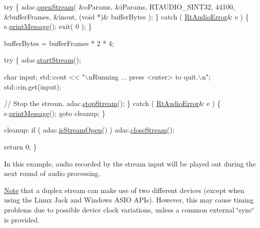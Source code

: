 \begin{DoxyCode}
  \textcolor{keywordflow}{try} \{
    adac.\hyperlink{class_rt_audio_a6907539d2527775df778ebce32ef1e3b}{openStream}( &oParams, &iParams, RTAUDIO\_SINT32, 44100, &bufferFrames, &inout, (\textcolor{keywordtype}{void} *)&
      bufferBytes );
  \}
  \textcolor{keywordflow}{catch} ( \hyperlink{class_rt_audio_error}{RtAudioError}& e ) \{
    e.\hyperlink{class_rt_audio_error_a0124bb90075cf3201865a0ea9b43a826}{printMessage}();
    exit( 0 );
  \}

  bufferBytes = bufferFrames * 2 * 4;

  \textcolor{keywordflow}{try} \{
    adac.\hyperlink{class_rt_audio_aec017a89629ccef66a90b60be22a2f80}{startStream}();

    \textcolor{keywordtype}{char} input;
    std::cout << \textcolor{stringliteral}{"\(\backslash\)nRunning ... press <enter> to quit.\(\backslash\)n"};
    std::cin.get(input);

    \textcolor{comment}{// Stop the stream.}
    adac.\hyperlink{class_rt_audio_af4c241ff86936ecc8108f0d9dfe3efdd}{stopStream}();
  \}
  \textcolor{keywordflow}{catch} ( \hyperlink{class_rt_audio_error}{RtAudioError}& e ) \{
    e.\hyperlink{class_rt_audio_error_a0124bb90075cf3201865a0ea9b43a826}{printMessage}();
    \textcolor{keywordflow}{goto} cleanup;
  \}

 cleanup:
  \textcolor{keywordflow}{if} ( adac.\hyperlink{class_rt_audio_a3863e45ff81dbe97176de0ee7545917f}{isStreamOpen}() ) adac.\hyperlink{class_rt_audio_a90d599002ad32cf250a4cb866f2cc93a}{closeStream}();

  \textcolor{keywordflow}{return} 0;
\}
\end{DoxyCode}


In this example, audio recorded by the stream input will be played out during the next round of audio processing.

\hyperlink{class_note}{Note} that a duplex stream can make use of two different devices (except when using the Linux Jack and Windows A\+S\+IO A\+P\+Is). However, this may cause timing problems due to possible device clock variations, unless a common external \char`\"{}sync\char`\"{} is provided. 